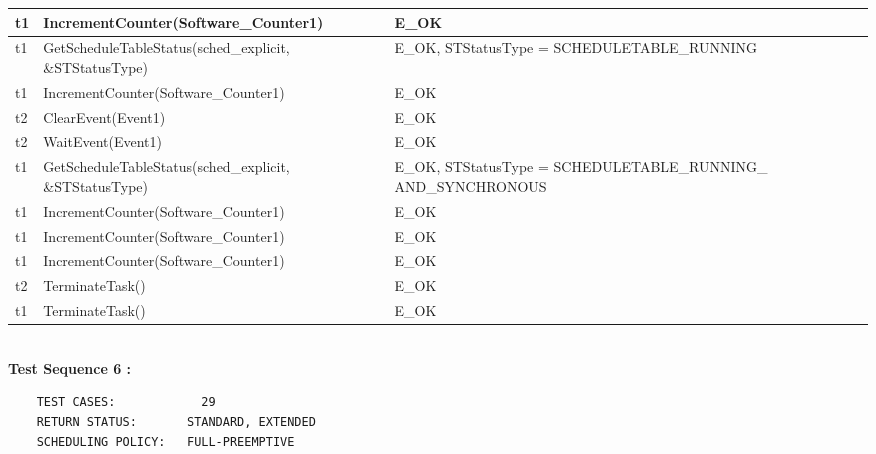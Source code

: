 \documentclass[10pt]{article}
\newlength{\Li}\settowidth{\Li}{Running}
\newlength{\Lii}\setlength{\Lii}{7cm}
\newlength{\Liiii}\setlength{\Liiii}{0.9cm}
\newlength{\Liii}\setlength{\Liii}{\textwidth} \addtolength{\Liii}{-\Li} \addtolength{\Liii}{-\Lii} \addtolength{\Liii}{-\Liiii}
\begin{document}
\begin{supertabular}{|p{\Li}|p{\Lii}|p{\Liii}|p{\Liiii}|}
	t1		& IncrementCounter(Software\_Counter1)						& E\_OK																	& \\ \hline
	t1		& GetScheduleTableStatus(sched\_explicit, \&STStatusType)			& E\_OK, STStatusType = SCHEDULETABLE\_RUNNING 							& \\ \hline
	t1		& IncrementCounter(Software\_Counter1)						& E\_OK																	& \\ \hline
	t2		& ClearEvent(Event1)										& E\_OK																	& \\ \hline
	t2		& WaitEvent(Event1)											& E\_OK																	& \\ \hline
	t1		& GetScheduleTableStatus(sched\_explicit, \&STStatusType)			& E\_OK, STStatusType = SCHEDULETABLE\_RUNNING\_ AND\_SYNCHRONOUS		& \\ \hline
	t1		& IncrementCounter(Software\_Counter1)						& E\_OK																	& \\ \hline
	t1		& IncrementCounter(Software\_Counter1)						& E\_OK																	& \\ \hline
	t1		& IncrementCounter(Software\_Counter1)						& E\_OK																	& \\ \hline
	t2		& TerminateTask()											& E\_OK																	& \\ \hline
	t1		& TerminateTask()											& E\_OK																	& \\ \hline
	\end{supertabular}\\

	\textbf{Test Sequence 6 :}
	\begin{lstlisting}
	TEST CASES:		       29
	RETURN STATUS:	  	 STANDARD, EXTENDED
	SCHEDULING POLICY:   FULL-PREEMPTIVE
	\end{lstlisting}
	
	
\end{document}
